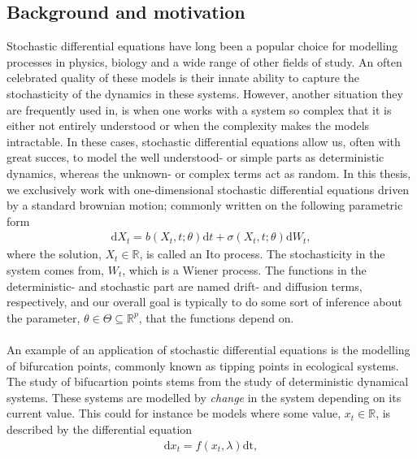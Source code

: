 \subsection{Background and motivation}
Stochastic differential equations have long been a popular choice for modelling processes in physics, biology and a wide range of other fields of study. An often celebrated quality of these models is their innate ability to capture the stochasticity of the dynamics in these systems. However, another situation they are frequently used in, is when one works with a system so complex that it is either not entirely understood or when the complexity makes the models intractable. In these cases, stochastic differential equations allow us, often with great succes, to model the well understood- or simple parts as deterministic dynamics, whereas the unknown- or complex terms act as random. In this thesis, we exclusively work with one-dimensional stochastic differential equations driven by a standard brownian motion; commonly written on the following parametric form
\begin{align}
    \mathrm{d}X_t = b(X_t, t;\theta)\mathrm{d}t + \sigma\left(X_t, t; \theta\right)\mathrm{d}W_t,
\end{align}
where the solution, $X_t\in\mathbb{R}$, is called an Ito process. The stochasticity in the system comes from, $W_t$, which is a Wiener process. The functions in the deterministic- and stochastic part are named drift- and diffusion terms, respectively, and our overall goal is typically to do some sort of inference about the parameter, $\theta\in\Theta\subseteq\mathbb{R}^p$, that the functions depend on. \\\\
An example of an application of stochastic differential equations is the modelling of bifurcation points, commonly known as tipping points in ecological systems. The study of bifucartion points stems from the study of deterministic dynamical systems. These systems are modelled by \textit{change} in the system depending on its current value. This could for instance be models where some value, $x_t\in\mathbb{R}$, is described by the differential equation
\begin{align}
    \mathrm{d}x_t = f(x_t, \lambda)\mathrm{dt},
\end{align}
